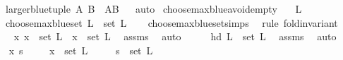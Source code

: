 \begin{isabellebody}
\ \ \ {\isachardoublequoteopen}larger{\isacharunderscore}{\kern0pt}blue{\isacharunderscore}{\kern0pt}tuple\ A\ B\ {\isasymin}\ {\isacharbraceleft}{\kern0pt}A{\isacharcomma}{\kern0pt}B{\isacharbraceright}{\kern0pt}{\isachardoublequoteclose}%
\isadelimproof
\ %
\endisadelimproof
%
\isatagproof
{}\isamarkupfalse%
\ auto%
\endisatagproof
{\isafoldproof}%
%
\isadelimproof
%
\endisadelimproof
%
\isadelimdocument
%
\endisadelimdocument
%
\isatagdocument
%
\isamarkuptrue%
%
\endisatagdocument
{\isafolddocument}%
%
\isadelimdocument
%
\endisadelimdocument
{}\isamarkupfalse%
\ choose{\isacharunderscore}{\kern0pt}max{\isacharunderscore}{\kern0pt}blue{\isacharunderscore}{\kern0pt}avoid{\isacharunderscore}{\kern0pt}empty{\isacharcolon}{\kern0pt}\isanewline
\ \ \ {\isachardoublequoteopen}L\ {\isasymnoteq}\ {\isacharbrackleft}{\kern0pt}{\isacharbrackright}{\kern0pt}{\isachardoublequoteclose}\isanewline
\ \ \ {\isachardoublequoteopen}choose{\isacharunderscore}{\kern0pt}max{\isacharunderscore}{\kern0pt}blue{\isacharunderscore}{\kern0pt}set\ L\ {\isasymin}\ set\ L{\isachardoublequoteclose}\isanewline
%
\isadelimproof
\ \ %
\endisadelimproof
%
\isatagproof
{}\isamarkupfalse%
\ choose{\isacharunderscore}{\kern0pt}max{\isacharunderscore}{\kern0pt}blue{\isacharunderscore}{\kern0pt}set{\isachardot}{\kern0pt}simps\ \isanewline
{}\isamarkupfalse%
\ {\isacharparenleft}{\kern0pt}rule\ fold{\isacharunderscore}{\kern0pt}invariant{\isacharparenright}{\kern0pt}\isanewline
\ \ \isamarkupfalse%
\ {\isachardoublequoteopen}\ {\isasymAnd}x{\isachardot}{\kern0pt}\ x\ {\isasymin}\ set\ L\ {\isasymLongrightarrow}\ x\ {\isasymin}\ set\ L{\isachardoublequoteclose}\ \isamarkupfalse%
\ assms\ \isamarkupfalse%
\ auto\isanewline
{}\isamarkupfalse%
\ \isanewline
\ \ \isamarkupfalse%
\ {\isachardoublequoteopen}hd\ L\ {\isasymin}\ set\ L{\isachardoublequoteclose}\ \isamarkupfalse%
\ assms\ \isamarkupfalse%
\ auto\isanewline
{}\isamarkupfalse%
\ \isanewline
\ \ \isamarkupfalse%
\ x\ s\ \isanewline
\ \ \isamarkupfalse%
\ {\isachardoublequoteopen}x\ {\isasymin}\ set\ L{\isachardoublequoteclose}\isanewline
\ \ \ \ \ {\isachardoublequoteopen}s\ {\isasymin}\ set\ L{\isachardoublequoteclose}\isanewline
\ \ \isamarkupfalse%

\end{isabellebody}
